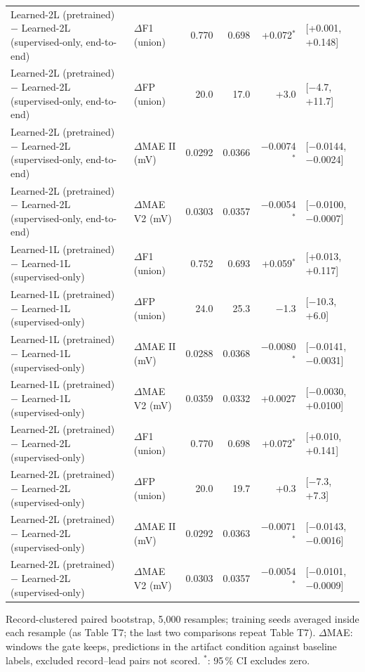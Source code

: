 \begin{table}[htbp]
\begin{tabular}{llrrrl}
Learned-2L (pretrained) $-$ Learned-2L (supervised-only, end-to-end) & $\Delta$F1 (union) & 0.770 & 0.698 & +0.072$^{*}$ & [+0.001, +0.148] \\
Learned-2L (pretrained) $-$ Learned-2L (supervised-only, end-to-end) & $\Delta$FP (union) & 20.0 & 17.0 & +3.0 & [$-$4.7, +11.7] \\
Learned-2L (pretrained) $-$ Learned-2L (supervised-only, end-to-end) & $\Delta$MAE II (mV) & 0.0292 & 0.0366 & $-$0.0074$^{*}$ & [$-$0.0144, $-$0.0024] \\
Learned-2L (pretrained) $-$ Learned-2L (supervised-only, end-to-end) & $\Delta$MAE V2 (mV) & 0.0303 & 0.0357 & $-$0.0054$^{*}$ & [$-$0.0100, $-$0.0007] \\
Learned-1L (pretrained) $-$ Learned-1L (supervised-only) & $\Delta$F1 (union) & 0.752 & 0.693 & +0.059$^{*}$ & [+0.013, +0.117] \\
Learned-1L (pretrained) $-$ Learned-1L (supervised-only) & $\Delta$FP (union) & 24.0 & 25.3 & $-$1.3 & [$-$10.3, +6.0] \\
Learned-1L (pretrained) $-$ Learned-1L (supervised-only) & $\Delta$MAE II (mV) & 0.0288 & 0.0368 & $-$0.0080$^{*}$ & [$-$0.0141, $-$0.0031] \\
Learned-1L (pretrained) $-$ Learned-1L (supervised-only) & $\Delta$MAE V2 (mV) & 0.0359 & 0.0332 & +0.0027 & [$-$0.0030, +0.0100] \\
Learned-2L (pretrained) $-$ Learned-2L (supervised-only) & $\Delta$F1 (union) & 0.770 & 0.698 & +0.072$^{*}$ & [+0.010, +0.141] \\
Learned-2L (pretrained) $-$ Learned-2L (supervised-only) & $\Delta$FP (union) & 20.0 & 19.7 & +0.3 & [$-$7.3, +7.3] \\
Learned-2L (pretrained) $-$ Learned-2L (supervised-only) & $\Delta$MAE II (mV) & 0.0292 & 0.0363 & $-$0.0071$^{*}$ & [$-$0.0143, $-$0.0016] \\
Learned-2L (pretrained) $-$ Learned-2L (supervised-only) & $\Delta$MAE V2 (mV) & 0.0303 & 0.0357 & $-$0.0054$^{*}$ & [$-$0.0101, $-$0.0009] \\
\bottomrule
\end{tabular}

\par\smallskip\footnotesize Record-clustered paired bootstrap, 5,000 resamples; training seeds averaged inside each resample (as Table T7; the last two comparisons repeat Table T7). $\Delta$MAE: windows the gate keeps, predictions in the artifact condition against baseline labels, excluded record--lead pairs not scored. $^{*}$: 95\,\% CI excludes zero.
\end{table}
